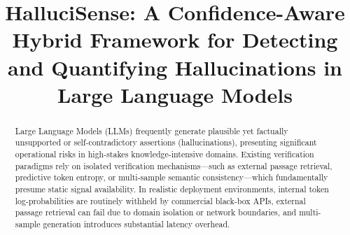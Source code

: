 \documentclass[conference]{IEEEtran}
\begin{document}
\title{HalluciSense: A Confidence-Aware Hybrid Framework for Detecting and Quantifying Hallucinations in Large Language Models}

\author{
}

\maketitle

\begin{abstract}
Large Language Models (LLMs) frequently generate plausible yet factually unsupported or self-contradictory assertions (hallucinations), presenting significant operational risks in high-stakes knowledge-intensive domains. Existing verification paradigms rely on isolated verification mechanisms---such as external passage retrieval, predictive token entropy, or multi-sample semantic consistency---which fundamentally presume static signal availability. In realistic deployment environments, internal token log-probabilities are routinely withheld by commercial black-box APIs, external passage retrieval can fail due to domain isolation or network boundaries, and multi-sample generation introduces substantial latency overhead.


\end{abstract}
\end{document}
